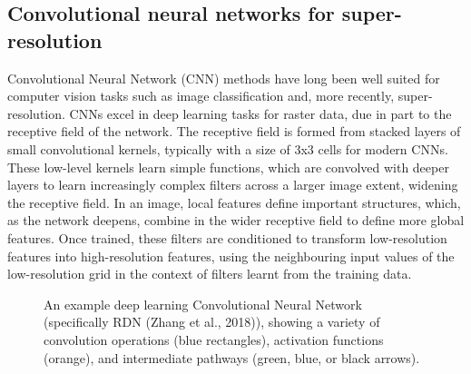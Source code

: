 \documentclass{article}
\begin{document}
\subsection{Convolutional neural networks for super-resolution}
Convolutional Neural Network (CNN) methods have long been well suited for computer vision tasks such as image classification and, more recently, super-resolution.
CNNs excel in deep learning tasks for raster data, due in part to the receptive field of the network.
The receptive field is formed from stacked layers of small convolutional kernels, typically with a size of 3x3 cells for modern CNNs.
These low-level kernels learn simple functions, which are convolved with deeper layers to learn increasingly complex filters across a larger image extent, widening the receptive field.
In an image, local features define important structures, which, as the network deepens, combine in the wider receptive field to define more global features.
Once trained, these filters are conditioned to transform low-resolution features into high-resolution features, using the neighbouring input values of the low-resolution grid in the context of filters learnt from the training data.

\begin{figure}[hbt]
    \caption[An example CNN]{
        An example deep learning Convolutional Neural Network (specifically RDN (Zhang et al., 2018)), showing a variety of convolution operations (blue rectangles), activation functions (orange), and intermediate pathways (green, blue, or black arrows).
        }
    \label{fig:egcnn}
\end{figure}
\end{document}
